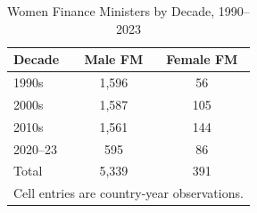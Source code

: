 \begin{table}[htbp]\centering
\def\sym#1{\ifmmode^{#1}\else\(^{#1}\)\fi}
\caption{Women Finance Ministers by Decade, 1990--2023}
\label{tab:decade}
\begin{tabular}{lcc}
\hline\hline
Decade & Male FM & Female FM \\
\hline
1990s   & 1,596 &  56 \\
2000s   & 1,587 & 105 \\
2010s   & 1,561 & 144 \\
2020--23 &   595 &  86 \\
\hline
Total   & 5,339 & 391 \\
\hline\hline
\multicolumn{3}{l}{\footnotesize Cell entries are country-year observations.}\\
\end{tabular}
\end{table}
